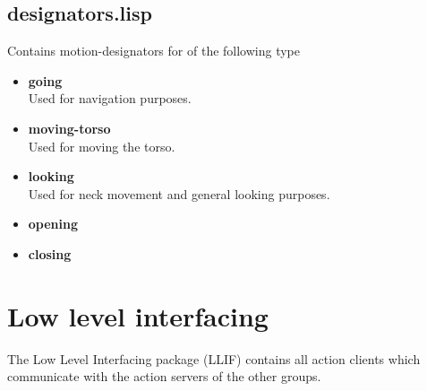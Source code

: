 \documentclass[main.tex]{subfiles}
\begin{document}
	    \subsection{designators.lisp}
	    Contains motion-designators for of the following type
	    \begin{itemize}
		\label{desig}
	    	\item \textbf{going} \\
		Used for navigation purposes.
		\item \textbf{moving-torso} \\
		Used for moving the torso.
		\item \textbf{looking} \\
		Used for neck movement and general looking purposes.
		\item \textbf{opening} \\
		
		\item \textbf{closing} \\
	    \end{itemize}

	  	\section{Low level interfacing}
	  	\label{llif}
		The Low Level Interfacing package (LLIF) contains all action clients which communicate with the action servers of the other groups.
\end{document}
